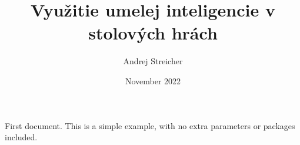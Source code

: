 \documentclass[12pt, a4paper]{article}
\begin{document}
\title{Využitie umelej inteligencie v stolových hrách}
\author{Andrej Streicher}
\date{November 2022}
\maketitle
First document. This is a simple example, with no 
extra parameters or packages included.
\end{document}
